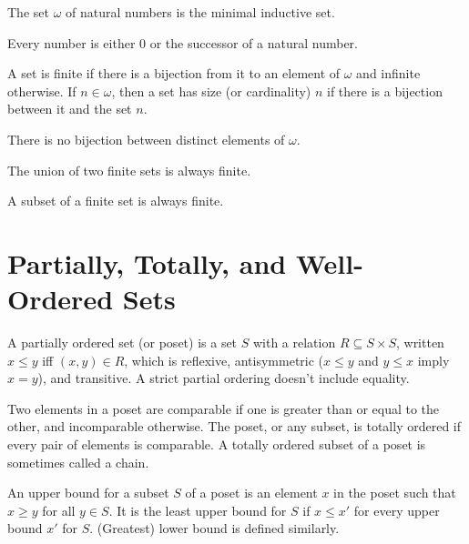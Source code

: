 \documentclass{report}
\begin{document}
\begin{definition}
  The set $\omega$ of natural numbers is the minimal inductive set.
\end{definition}

\begin{lemma}
  Every number is either 0 or the successor of a natural number.
\end{lemma}

\begin{definition}
  A set is finite if there is a bijection from it to an element of $\omega$ and infinite  otherwise. If $n \in \omega$, then a set has size (or cardinality) $n$ if there is a bijection between it and the set $n$.
\end{definition}

\begin{proposition}
  There is no bijection between distinct elements of $\omega$.
\end{proposition}

\begin{proposition}
  The union of two finite sets is always finite.
\end{proposition}

\begin{proposition}
  A subset of a finite set is always finite.
\end{proposition}

 \newpage
\section{Partially, Totally, and Well-Ordered Sets}
\begin{definition}
  A partially ordered set (or poset) is a set $S$ with a relation $R \subseteq S \times S$, written $x \leq y$ iff $(x,y) \in R$, which is reflexive, antisymmetric ($x \leq y$ and $y \leq x$ imply $x = y$), and transitive. A strict partial ordering doesn't include equality. 
\end{definition}

\begin{definition}
 Two elements in a poset are comparable if one is greater than or equal to the other, and incomparable otherwise. The poset, or any subset, is totally ordered if every pair of elements is comparable. A totally ordered subset of a poset is sometimes called a chain.
\end{definition}

\begin{definition}
  An upper bound for a subset $S$ of a poset is an element $x$ in the poset such that $x \geq y$ for all $y \in S$. It is the least upper bound for $S$ if $x \leq x'$ for every upper bound $x'$ for $S$. (Greatest) lower bound is defined similarly.
\end{definition}
\end{document}

